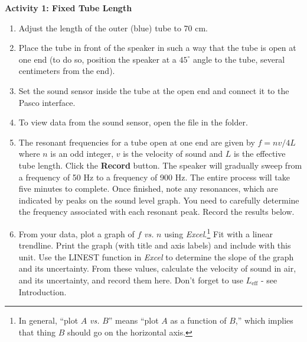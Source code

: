 \textbf{Activity 1: Fixed Tube Length} 
\begin{enumerate}[labparts]



\item Adjust the length of the outer (blue) tube to 70 cm.

\item Place the tube in front of the speaker in such a way that the tube is open at one end (to do so, position the speaker at a $45^\circ$ angle to the tube, several centimeters from the end).

\item Set the sound sensor inside the tube at the open end and connect it to the Pasco interface.

\item To view data from the sound sensor, open the file  in the \filename{\coursefolder} folder.  


\item The resonant frequencies for a tube open at one end are given by $f=nv/4L$ where $n$ is an odd integer, $v$ is the velocity of sound and $L$ is the effective tube length. Click the \textbf{Record} button. The speaker will gradually sweep from a frequency of 50 Hz to a frequency of 900 Hz. The entire process will take five minutes to complete. Once finished, note any resonances, which are indicated by peaks on the sound level graph. You need to carefully determine the frequency associated with each resonant peak.  Record the results below.
\vspace{30mm}

\item From your data, plot a graph of $f$ \textit{vs.} $n$ using \textit{Excel}.\footnote{In general, ``plot $A$ \textit{vs.} $B$'' means ``plot $A$ as a function of $B$,'' which implies that thing $B$ should go on the horizontal axis.} Fit with a linear trendline. Print the graph (with title and axis labels) and include with this unit. Use the LINEST function in \textit{Excel} to determine the slope of the graph and its uncertainty. From these values, calculate the velocity of sound in air, and its uncertainty, and record them here. Don't forget to use $L_{\mathrm{eff}}$ - see Introduction.
\vspace{10mm}

\end{enumerate}

